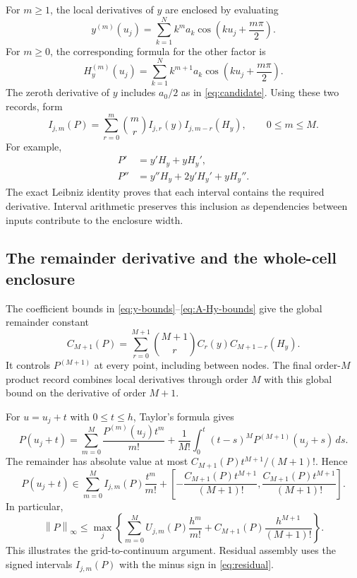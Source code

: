 \documentclass[11pt]{article}
\numberwithin{equation}{section}
\newcommand{\norm}[1]{\left\|#1\right\|_{\infty}}
\newcommand{\HH}{H_y}
\begin{document}
For $m\geq1$, the local derivatives of $y$ are enclosed by evaluating
\begin{equation}
 y^{(m)}(u_j)=\sum_{k=1}^{N}k^ma_k
 \cos\!\left(ku_j+\frac{m\pi}{2}\right).
\end{equation}
For $m\geq0$, the corresponding formula for the other factor is
\begin{equation}
 \HH^{(m)}(u_j)=\sum_{k=1}^{N}k^{m+1}a_k
 \cos\!\left(ku_j+\frac{m\pi}{2}\right).
\end{equation}
The zeroth derivative of $y$ includes $a_0/2$ as in \eqref{eq:candidate}.
Using these two records, form
\begin{equation}
 \boxed{I_{j,m}(P)=\sum_{r=0}^{m}\binom mr
 I_{j,r}(y)I_{j,m-r}(\HH),\qquad 0\leq m\leq M.}
 \label{eq:P-local}
\end{equation}
For example,
\begin{align}
 P'&=y'\HH+y\HH',\\
 P''&=y''\HH+2y'\HH'+y\HH''.
\end{align}
The exact Leibniz identity proves that each interval contains the required
derivative. Interval arithmetic preserves this inclusion as dependencies
between inputs contribute to the enclosure width.

\subsection{The remainder derivative and the whole-cell enclosure}

The coefficient bounds in \eqref{eq:y-bounds}--\eqref{eq:A-Hy-bounds}
give the global remainder constant
\begin{equation}
 \boxed{C_{M+1}(P)=\sum_{r=0}^{M+1}\binom{M+1}{r} C_r(y)C_{M+1-r}(\HH).}
 \label{eq:P-remainder-bound}
\end{equation}
It controls $P^{(M+1)}$ at every point, including between nodes. The final
order-$M$ product record combines local derivatives through order $M$ with
this global bound on the derivative of order $M+1$.

For $u=u_j+t$ with $0\leq t\leq h$, Taylor's formula gives
\begin{equation}
 P(u_j+t)=\sum_{m=0}^{M}\frac{P^{(m)}(u_j)t^m}{m!}
 +\frac{1}{M!}\int_0^t(t-s)^MP^{(M+1)}(u_j+s)\,ds.
\end{equation}
The remainder has absolute value at most $C_{M+1}(P)t^{M+1}/(M+1)!$. Hence
\begin{equation}
 \boxed{P(u_j+t)\in
 \sum_{m=0}^{M} I_{j,m}(P)\frac{t^m}{m!}
 +\left[-\frac{C_{M+1}(P)t^{M+1}}{(M+1)!},\frac{C_{M+1}(P)t^{M+1}}{(M+1)!}\right].}
 \label{eq:P-cell}
\end{equation}
In particular,
\begin{equation}
 \norm{P}\leq\max_j\left\{
 \sum_{m=0}^{M}U_{j,m}(P)\frac{h^m}{m!}
 +C_{M+1}(P)\frac{h^{M+1}}{(M+1)!}\right\}.
 \label{eq:P-bound}
\end{equation}
This illustrates the grid-to-continuum argument. Residual assembly uses
the signed intervals $I_{j,m}(P)$ with the minus sign in
\eqref{eq:residual}.
\end{document}
